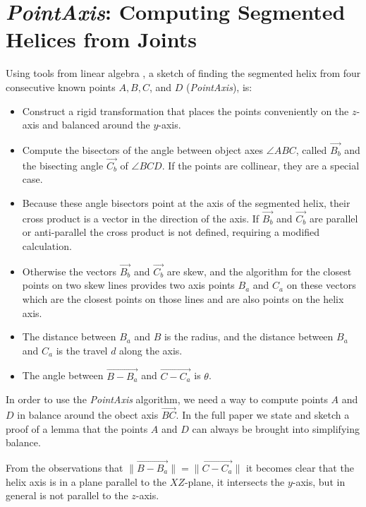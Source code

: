 \documentclass{svproc}
\begin{document}
\section{{\em PointAxis}: Computing Segmented Helices from Joints}
\label{sec:pointaxis}

Using tools from linear algebra \cite{kahn1989defining}, a sketch of finding the segmented helix from
four consecutive known points $A,B,C$, and $D$ ({\em PointAxis}), is:
\begin{itemize}
\item Construct a rigid transformation that places the points conveniently on the $z$-axis and balanced
  around the $y$-axis.
\item Compute the bisectors of the angle between object axes $ \angle{ABC}$, called $\overrightarrow{B_b}$ and the
  bisecting angle $\overrightarrow{C_b}$ of $\angle{BCD}$.
  If the points are collinear, they are a special case.
\item Because these angle bisectors point at the axis of the segmented helix, their cross product is a vector
  in the direction of the axis. If $\overrightarrow{B_b}$ and $\overrightarrow{C_b}$ are parallel or anti-parallel the cross product is not defined, requiring a modified calculation.
\item  Otherwise the vectors $\overrightarrow{B_b}$ and $\overrightarrow{C_b}$ are skew, and the algorithm for the closest points on
  two skew lines provides two axis points $B_a$ and $C_a$ on these vectors which
  are the closest points on those lines and are also points on the helix axis.
\item The distance between $B_a$ and $B$ is the radius, and the distance between $B_a$ and $C_a$ is the travel $d$ along the axis.
  \item The angle between $\overrightarrow{B - B_a}$ and $\overrightarrow{C - C_a}$ is $\theta$.
\end{itemize}

In order to use the {\em PointAxis} algorithm, we need a way
to compute points $A$ and $D$ in balance around the obect axis $\overrightarrow{BC}$. In the full paper\cite{readfullsegmentedhelix}
we state and sketch a proof of a lemma that the points $A$ and $D$ can always be brought into simplifying balance.

From the observations that $\| \overrightarrow{B - B_a} \| = \| \overrightarrow{C - C_a} \|$
it becomes clear that the helix axis is in a plane
parallel to the $XZ$-plane, it intersects the $y$-axis, but in general is
not parallel to the $z$-axis.
\end{document}

